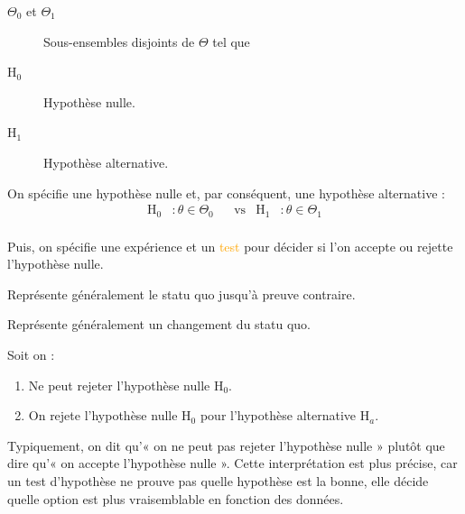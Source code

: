 \documentclass[10pt, french]{article}
\begin{document}
\begin{multicols*}{2}
\begin{rappel_enhanced}[Contexte]
\end{rappel_enhanced}

\begin{distributions}[Notation]
\begin{description}
	\item[$\Theta_{0}$ et $\Theta_{1}$]	Sous-ensembles disjoints de $\Theta$ tel que 
	\item[$\textrm{H}_{0}$]	Hypothèse nulle.
	\item[$\textrm{H}_{1}$]	Hypothèse alternative.
\end{description}
\end{distributions}


\begin{definitionNOHFILL}
On spécifie une \textcolor{burntorange}{hypothèse} nulle et, par conséquent, une hypothèse alternative :
\begin{align*}
	\textrm{H}_{0}
	&:	\theta \in \Theta_{0}	&
	&\text{vs}	&
	\textrm{H}_{1}
	&:	\theta \in \Theta_{1}	\\
\end{align*}

Puis, on spécifie une \textcolor{orange-red}{expérience} et un \textcolor{orange}{test} pour décider si l'on accepte ou rejette l'hypothèse nulle.

\begin{definitionNOHFILLsub}
Représente généralement le statu quo jusqu'à preuve contraire.
\end{definitionNOHFILLsub}

\begin{definitionNOHFILLsub}
Représente généralement un changement du statu quo.
\end{definitionNOHFILLsub}

\begin{definitionNOHFILLprop}
Soit on : 
\begin{enumerate}[label = \circled{\arabic*}{trueblue}]
	\item	Ne peut rejeter l'hypothèse nulle $\textrm{H}_{0}$.
	\item	On rejete l'hypothèse nulle $\mathrm{H}_{0}$ pour l'hypothèse alternative $\mathrm{H}_{a}$.
\end{enumerate}
\end{definitionNOHFILLprop}
\end{definitionNOHFILL}

\begin{rappel_enhanced}[Contexte]
Typiquement, on dit qu’« on ne peut pas rejeter l'hypothèse nulle » plutôt que dire qu’« on accepte l'hypothèse nulle ». Cette interprétation est plus précise, car un test d'hypothèse ne prouve pas quelle hypothèse est la bonne, elle décide quelle option est plus vraisemblable en fonction des données. 


\end{rappel_enhanced}
\end{multicols*}
\end{document}
